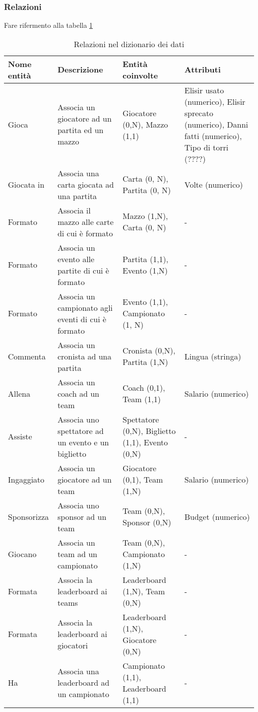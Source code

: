 \documentclass{article}
\begin{document}
\subsubsection{Relazioni}
Fare rifermento alla tabella \ref{table_relazioni_dizionario}

\begin{table}
\centering
\begin{tabularx}{\textwidth}{|l|X|X|X|}
\hline
\textbf{Nome entità}   & \textbf{Descrizione} & \textbf{Entità coinvolte} & \textbf{Attributi} \\ \hline
Gioca & Associa un giocatore ad un partita ed un mazzo & Giocatore (0,N), Mazzo (1,1) & Elisir usato (numerico), Elisir sprecato (numerico), Danni fatti (numerico), Tipo di torri (????) \\ \hline
Giocata in & Associa una carta giocata ad una partita & Carta (0, N), Partita (0, N) & Volte (numerico) \\ \hline
Formato & Associa il mazzo alle carte di cui è formato & Mazzo (1,N), Carta (0, N) & - \\ \hline
Formato & Associa un evento alle partite di cui è formato & Partita (1,1), Evento (1,N) & - \\ \hline
Formato & Associa un campionato agli eventi di cui è formato & Evento (1,1), Campionato (1, N) & - \\ \hline
Commenta & Associa un cronista ad una partita & Cronista (0,N), Partita (1,N) & Lingua (stringa) \\ \hline
Allena & Associa un coach ad un team & Coach (0,1), Team (1,1) & Salario (numerico) \\ \hline
Assiste & Associa uno spettatore ad un evento e un biglietto & Spettatore (0,N), Biglietto (1,1), Evento (0,N) & - \\ \hline
Ingaggiato & Associa un giocatore ad un team & Giocatore (0,1), Team (1,N) & Salario (numerico) \\ \hline
Sponsorizza & Associa uno sponsor ad un team & Team (0,N), Sponsor (0,N) & Budget (numerico) \\ \hline
Giocano & Associa un team ad un campionato & Team (0,N), Campionato (1,N) & - \\ \hline
Formata & Associa la leaderboard ai teams & Leaderboard (1,N), Team (0,N) & - \\ \hline
Formata & Associa la leaderboard ai giocatori& Leaderboard (1,N), Giocatore (0,N) & - \\ \hline
Ha & Associa una leaderboard ad un campionato & Campionato (1,1), Leaderboard (1,1) & - \\ \hline

\end{tabularx}
\caption{Relazioni nel dizionario dei dati}
\label{table_relazioni_dizionario}
\end{table}
\end{document}
